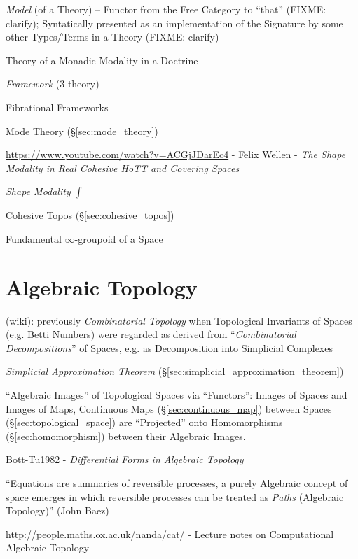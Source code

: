 \emph{Model} (of a Theory) -- Functor from the Free Category to ``that'' (FIXME:
clarify); Syntatically presented as an implementation of the Signature by some
other Types/Terms in a Theory (FIXME: clarify)

Theory of a Monadic Modality in a Doctrine

\emph{Framework} (3-theory) --

Fibrational Frameworks

Mode Theory (\S\ref{sec:mode_theory})

\url{https://www.youtube.com/watch?v=ACGjJDarEc4} - Felix Wellen - \emph{The
  Shape Modality in Real Cohesive HoTT and Covering Spaces}

\emph{Shape Modality} $\int$

Cohesive Topos (\S\ref{sec:cohesive_topos})

Fundamental $\infty$-groupoid of a Space



\section{Algebraic Topology}\label{sec:algebraic_topology}

(wiki): previously \emph{Combinatorial Topology} when Topological Invariants of
Spaces (e.g. Betti Numbers) were regarded as derived from ``\emph{Combinatorial
  Decompositions}'' of Spaces, e.g. as Decomposition into Simplicial Complexes

\emph{Simplicial Approximation Theorem}
(\S\ref{sec:simplicial_approximation_theorem})

``Algebraic Images'' of Topological Spaces via ``Functors'': Images of
Spaces and Images of Maps, Continuous Maps
(\S\ref{sec:continuous_map}) between Spaces
(\S\ref{sec:topological_space}) are ``Projected'' onto Homomorphisms
(\S\ref{sec:homomorphism}) between their Algebraic
Images.\cite{hatcher02}

Bott-Tu1982 - \emph{Differential Forms in Algebraic Topology}

``Equations are summaries of reversible processes, a purely Algebraic concept of
space emerges in which reversible processes can be treated as \emph{Paths}
(Algebraic Topology)''
(John Baez)

\url{http://people.maths.ox.ac.uk/nanda/cat/} - Lecture notes on Computational
Algebraic Topology



